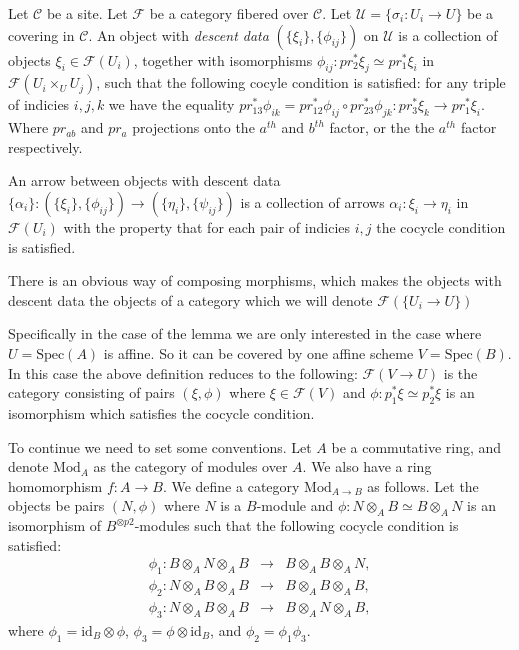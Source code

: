 \begin{definition}
\label{definition-category-descent-datum}
Let $\mathcal C$ be a site.  Let $\mathcal F$ be a category fibered over
$\mathcal C$.  Let $\mathcal U = \{\sigma_i : U_i \rightarrow U\}$ be a
covering in $\mathcal C$.  An object with {\it descent data}
$(\{\xi_i\}, \{\phi_{ij}\})$ on $\mathcal U$ is a collection of objects
$\xi_i \in \mathcal F(U_i)$, together with isomorphisms
$\phi_{ij}: pr_2^*\xi_j \simeq pr_1^*\xi_i$ in
$\mathcal F(U_i \times_U U_j)$, such that the following cocyle condition
is satisfied:  for any triple of indicies $i, j, k$ we have the equality
$pr_{13}^*\phi_{ik} = pr_{12}^*\phi_{ij} \circ pr_{23}^*\phi_{jk}:
pr_3^*\xi_k \rightarrow pr_1^*\xi_i$.  Where $pr_{ab}$ and $pr_a$
projections onto the $a^{th}$ and $b^{th}$ factor, or the the $a^{th}$
factor respectively.

\medskip\noindent
An arrow between objects with descent data
$\{\alpha_i\}: (\{\xi_i\}, \{\phi_{ij}\}) \rightarrow
(\{\eta_i\}, \{\psi_{ij}\})$ is a collection of arrows
$\alpha_i : \xi_i \rightarrow \eta_i$ in $\mathcal F(U_i)$ with the property
that for each pair of indicies $i, j$ the cocycle condition is satisfied.

\medskip\noindent
There is an obvious way of composing morphisms, which makes the objects with
descent data the objects of a category which we will denote
$\mathcal F(\{U_i \rightarrow U\})$

\medskip\noindent
Specifically in the case of the lemma we are only interested in the case where
$U = \text{Spec}(A)$ is affine.  So it can be covered by one affine scheme
$V = \text{Spec}(B)$.  In this case the above definition reduces to the
following:  $\mathcal F(V \rightarrow U)$ is the category consisting of pairs
$(\xi, \phi)$ where $\xi \in \mathcal F(V)$ and
$\phi: p_1^*\xi  \simeq p_2^*\xi$ is an isomorphism which satisfies the
cocycle condition.
\end{definition}

\noindent
To continue we need to set some conventions.  Let $A$ be a commutative ring,
and denote $\text{Mod}_A$ as the category of modules over $A$.  We also have a
ring
homomorphism $f: A \rightarrow B$.  We define a category
$\text{Mod}_{A\rightarrow B}$ as follows.  Let the objects be pairs $(N, \phi)$
where $N$ is a $B$-module and $\phi:  N \otimes_A B \simeq B \otimes_A N$
is an isomorphism of $B^{\otimes p2}$-modules such that the following cocycle
condition is satisfied:
\begin{eqnarray}
\phi_1: B \otimes_A N \otimes_A B & \rightarrow & B \otimes_A B \otimes_A N,
\nonumber\\
\phi_2: N \otimes_A B \otimes_A B & \rightarrow & B \otimes_A B \otimes_A B,
\nonumber\\
\phi_3: N \otimes_A B \otimes_A B & \rightarrow & B \otimes_A N \otimes_A B,
\nonumber
\end{eqnarray}
where $\phi_1 = \text{id}_B \otimes \phi$, $\phi_3 = \phi \otimes \text{id}_B$,
and
$\phi_2 = \phi_1\phi_3$.

